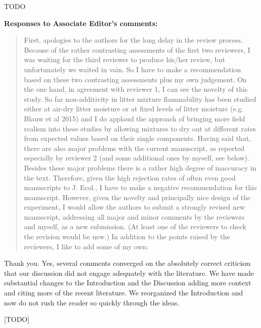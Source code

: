 \documentclass[letterpaper, 12pt]{letter}
\begin{document}
\begin{letter}{}
\begin{quote}
\end{quote}

TODO


{\bf Responses to Associate Editor's comments:}

\begin{quote}
First, apologies to the authors for the long delay in the review process. Because of the rather contrasting assessments of the first two reviewers, I was waiting for the third reviewer to produce his/her review, but unfortunately we waited in vain. So I have to make a recommendation based on these two contrasting assessments plus my own judgement. On the one hand, in agreement with reviewer 1, I can see the novelty of this study. So far non-additivity in litter mixture flammability has been studied either at air-dry litter moisture or at fixed levels of litter moisture (e.g. Blauw et al 2015) and I do applaud the approach of bringing more field realism into these studies by allowing mixtures to dry out at different rates from expected values based on their single components. Having said that, there are also major problems with the current manuscript, as reported especially by reviewer 2 (and some additional ones by myself, see below). Besides these major problems there is a rather high degree of inaccuracy in the text.  Therefore, given the high rejection rates of often even good manuscripts to J. Ecol., I have to make a negative recommendation for this manuscript. However, given the novelty and principally nice design of the experiment, I would allow the authors to submit a strongly revised new manuscript, addressing all major and minor comments by the reviewers and myself, as a new submission. (At least one of the reviewers to check the revision would be new.) In addition to the points raised by the reviewers, I like to add some of my own:
\end{quote}

Thank you. Yes, several comments converged on the absolutely correct criticism that our discussion did not engage adequately with the literature. We have made substantial changes to the Introduction and the Discussion adding more context and citing more of the recent literature.  We reorganized the Introduction and now do not rush the reader so quickly through the ideas.

[TODO]


\end{letter}
\end{document}
